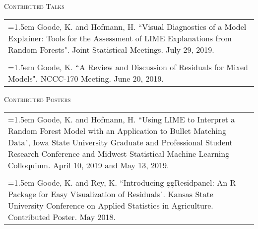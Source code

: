 \documentclass[10pt, oneside]{article}
\begin{document}
\noindent \textsc{Contributed Talks} \hrulefill
\begin{longtable}{p{16.5cm}}
\hangindent=1.5em Goode, K. and Hofmann, H. ``Visual Diagnostics of a Model Explainer: Tools for the Assessment of LIME Explanations from Random Forests". Joint Statistical Meetings. July 29, 2019.\\
\\
\hangindent=1.5em Goode, K. ``A Review and Discussion of Residuals for Mixed Models". NCCC-170 Meeting. June 20, 2019.
\end{longtable}

\noindent \textsc{Contributed Posters} \hrulefill
\begin{longtable}{p{16.5cm}}
\hangindent=1.5em Goode, K. and Hofmann, H. ``Using LIME to Interpret a Random Forest Model with an Application to Bullet Matching Data", Iowa State University Graduate and Professional Student Research Conference and Midwest Statistical Machine Learning Colloquium. April 10, 2019 and May 13, 2019.\\
\\ 
\hangindent=1.5em Goode, K. and Rey, K. ``Introducing ggResidpanel: An R Package for Easy Visualization of Residuals". Kansas State University Conference on Applied Statistics in Agriculture. Contributed Poster. May 2018.
\end{longtable}
\end{document}
